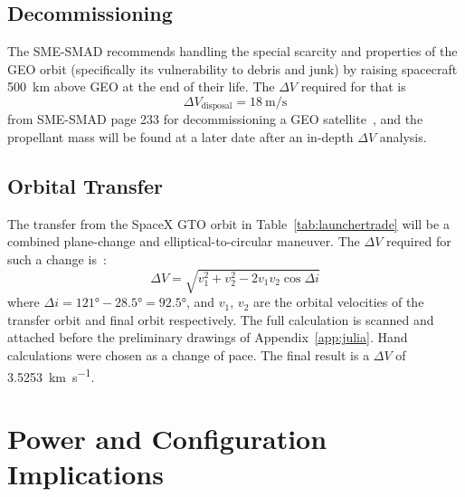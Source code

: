 \documentclass[9pt]{article}
\begin{document}
\subsection{Decommissioning}

The SME-SMAD recommends handling the special scarcity and properties of the GEO orbit (specifically its vulnerability to debris and junk) by raising spacecraft \qty{500}{\kilo\metre} above GEO at the end of their life.
The $\Delta V$ required for that is
\begin{equation}
  {\Delta V}_\text{disposal} = \qty{18}{\metre\per\second}
\end{equation}
from SME-SMAD page 233 for decommissioning a GEO satellite~\cite{sme}, and the propellant mass will be found at a later date after an in-depth $\Delta V$ analysis.

\subsection{Orbital Transfer}
The transfer from the SpaceX GTO orbit in Table~\ref{tab:launchertrade} will be a combined plane-change and elliptical-to-circular maneuver.
The $\Delta V$ required for such a change is~\cite{aero3240}:
\begin{equation}
  \Delta V=\sqrt{v_1^2+v_2^2-2v_1v_2\cos{\Delta i}}
\end{equation}
where $\Delta i=\ang{121}-\ang{28.5}=\ang{92.5}$, and $v_1,\,v_2$ are the orbital velocities of the transfer orbit and final orbit respectively.
The full calculation is scanned and attached before the preliminary drawings of Appendix~\ref{app:julia}.
Hand calculations were chosen as a change of pace.
The final result is a $\Delta V$ of \qty{3.5253}{\kilo\meter\per\second}.


\section{Power and Configuration Implications}\label{app:powerandconf}
\end{document}
